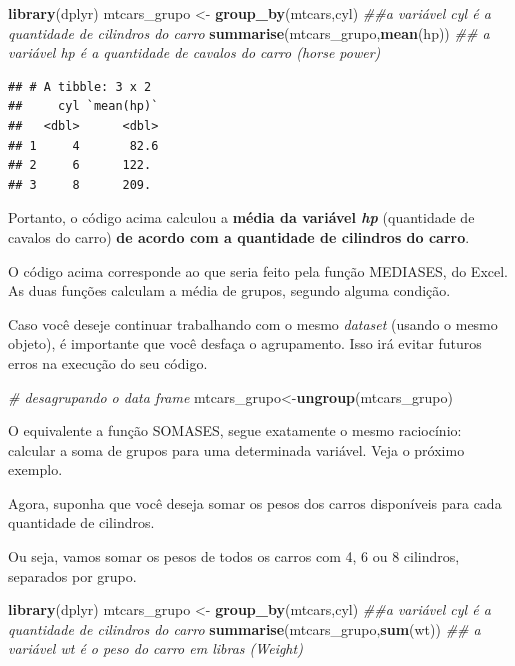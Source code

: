 \documentclass[
]{book}
\newenvironment{Shaded}{\begin{snugshade}}{\end{snugshade}}
\newcommand{\CommentTok}[1]{\textcolor[rgb]{0.56,0.35,0.01}{\textit{#1}}}
\newcommand{\KeywordTok}[1]{\textcolor[rgb]{0.13,0.29,0.53}{\textbf{#1}}}
\newcommand{\NormalTok}[1]{#1}
\newcommand{\StringTok}[1]{\textcolor[rgb]{0.31,0.60,0.02}{#1}}
\begin{document}
\begin{Shaded}
\begin{Highlighting}[]
\KeywordTok{library}\NormalTok{(dplyr)}
\NormalTok{mtcars_grupo <-}\StringTok{ }\KeywordTok{group_by}\NormalTok{(mtcars,cyl)  }\CommentTok{##a variável cyl é a quantidade de cilindros do carro}
\KeywordTok{summarise}\NormalTok{(mtcars_grupo,}\KeywordTok{mean}\NormalTok{(hp))    }\CommentTok{## a variável hp é a quantidade de cavalos do carro (horse power)}
\end{Highlighting}
\end{Shaded}

\begin{verbatim}
## # A tibble: 3 x 2
##     cyl `mean(hp)`
##   <dbl>      <dbl>
## 1     4       82.6
## 2     6      122. 
## 3     8      209.
\end{verbatim}

Portanto, o código acima calculou a \textbf{média da variável \emph{hp}}
(quantidade de cavalos do carro) \textbf{de acordo com a quantidade de
cilindros do carro}.

O código acima corresponde ao que seria feito pela função MEDIASES, do
Excel. As duas funções calculam a média de grupos, segundo alguma
condição.

Caso você deseje continuar trabalhando com o mesmo \emph{dataset}
(usando o mesmo objeto), é importante que você desfaça o agrupamento.
Isso irá evitar futuros erros na execução do seu código.

\begin{Shaded}
\begin{Highlighting}[]
\CommentTok{# desagrupando o data frame}
\NormalTok{mtcars_grupo<-}\KeywordTok{ungroup}\NormalTok{(mtcars_grupo)}
\end{Highlighting}
\end{Shaded}

O equivalente a função SOMASES, segue exatamente o mesmo raciocínio:
calcular a soma de grupos para uma determinada variável. Veja o próximo
exemplo.

Agora, suponha que você deseja somar os pesos dos carros disponíveis
para cada quantidade de cilindros.

Ou seja, vamos somar os pesos de todos os carros com 4, 6 ou 8
cilindros, separados por grupo.

\begin{Shaded}
\begin{Highlighting}[]
\KeywordTok{library}\NormalTok{(dplyr)}
\NormalTok{mtcars_grupo <-}\StringTok{ }\KeywordTok{group_by}\NormalTok{(mtcars,cyl)  }\CommentTok{##a variável cyl é a quantidade de cilindros do carro}
\KeywordTok{summarise}\NormalTok{(mtcars_grupo,}\KeywordTok{sum}\NormalTok{(wt))    }\CommentTok{## a variável wt é o peso do carro em libras (Weight)}
\end{Highlighting}
\end{Shaded}
\end{document}
